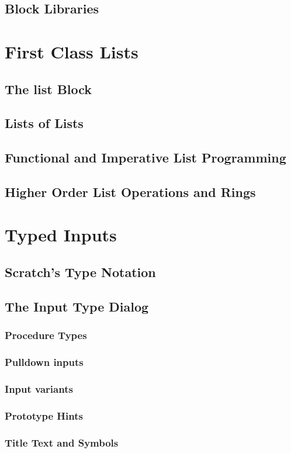 \documentclass[a4paper]{report}
\begin{document}
\section{Block Libraries}
\chapter{First Class Lists}
\section{The list Block}
\section{Lists of Lists}
\section{Functional and Imperative List Programming}
\section{Higher Order List Operations and Rings}
\chapter{Typed Inputs}
\section{Scratch's Type Notation}
\section{The \Snap{} Input Type Dialog}
\subsection{Procedure Types}
\subsection{Pulldown inputs}
\subsection{Input variants}
\subsection{Prototype Hints}
\subsection{Title Text and Symbols}
\end{document}
